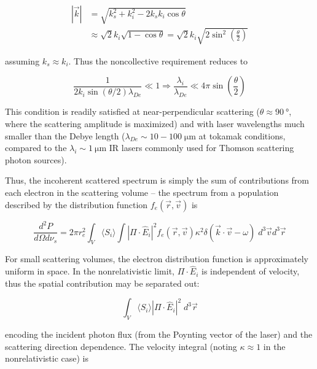 \begin{equation}
 \begin{aligned}
 \left| \vec{k} \right| &= \sqrt{k_s^2 + k_i^2 - 2k_s k_i \cos \theta}\\ &\approx \sqrt{2} k_i \sqrt{1 - \cos \theta} = \sqrt{2} k_i \sqrt{2 \sin^2 \left(\frac{\theta}{2}\right)}
 \end{aligned}
\end{equation}

\noindent assuming $k_s \approx k_i$.  Thus the noncollective requirement reduces to

\begin{equation}\label{eq:ts_incoherent}
 \frac{1}{2k_i \sin(\theta/2) \lambda_{De}} \ll 1 \Rightarrow \frac{\lambda_i}{\lambda_{De}} \ll 4\pi \sin \left(\frac{\theta}{2}\right)
\end{equation}

\noindent This condition is readily satisfied at near-perpendicular scattering ($\theta \approx \SI{90}{\degree}$, where the scattering amplitude is maximized) and with laser wavelengths much smaller than the Debye length ($\lambda_{De} \sim 10-100 \;\si{\micro\meter}$ at tokamak conditions, compared to the $\lambda_i \sim \SI{1}{\micro\meter}$ IR lasers commonly used for Thomson scattering photon sources).

Thus, the incoherent scattered spectrum is simply the sum of contributions from each electron in the scattering volume -- the spectrum from a population described by the distribution function $f_e(\vec{r},\vec{v})$ is

\begin{equation}\label{eq:ts_powerspectrumint}
 \frac{d^2 P}{d\Omega d\nu_s} = 2\pi r_e^2 \int_{V} \langle S_i \rangle \int \left| \Pi \cdot \hat{E}_i \right|^2 f_e(\vec{r},\vec{v}) \kappa^2 \delta(\vec{k} \cdot \vec{v} - \omega) \;d^3 \vec{v} d^3 \vec{r}
\end{equation}

\noindent For small scattering volumes, the electron distribution function is approximately uniform in space.  In the nonrelativistic limit, $\Pi \cdot \hat{E}_i$ is independent of velocity, thus the spatial contribution may be separated out:

\begin{equation}
 \int_V \langle S_i \rangle \left| \Pi \cdot \hat{E}_i \right|^2 \;d^3 \vec{r}
\end{equation}

\noindent encoding the incident photon flux (from the Poynting vector of the laser) and the scattering direction dependence.  The velocity integral (noting $\kappa \approx 1$ in the nonrelativistic case) is

